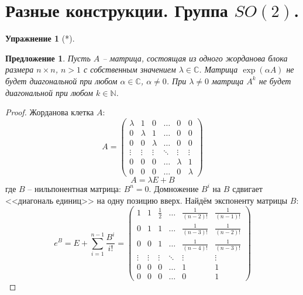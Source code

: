 \documentclass[12pt]{article}
\newtheorem{predl}[theorem]{Предложение}
\theoremstyle{definition}
\newtheorem{upr}[zad]{Упражнение}
\begin{document}
\section{Разные конструкции. Группа $SO(2)$.}
\begin{upr}[*]
\begin{predl}
    Пусть $A$ -- матрица, состоящая из одного жорданова блока размера $n\times n$, $n>1$ с собственным значением $\lambda\in\mathbb{C}$. Матрица $\exp(\alpha A)$ не будет диагональной при любом $\alpha\in\mathbb{C}$, $\alpha\neq 0$. При $\lambda\neq 0$ матрица $A^k$ не будет диагональной при любом $k\in\mathbb{N}$.
\end{predl}
\begin{proof}
    Жорданова клетка $A$:
    \begin{equation}
    A = \left(
    \begin{array}{cccccc}
    \lambda & 1 & 0 & \ldots & 0 & 0\\
    0 & \lambda & 1 & \ldots & 0 & 0\\
    0 & 0 & \lambda & \ldots & 0 & 0\\
    \vdots & \vdots & \vdots &\ddots & \vdots & \vdots\\
    0 & 0 & 0 & \ldots & \lambda & 1\\
    0 & 0 & 0 & \ldots & 0 & \lambda
    \end{array}
    \right)
    \end{equation}
    \begin{equation}
        A=\lambda E+B
    \end{equation}
    где $B$ -- нильпонентная матрица: $B^n=0$. Домножение $B^i$ на $B$ сдвигает <<диагональ единиц>> на одну позицию вверх. Найдём экспоненту матрицы $B$:
    \begin{equation}
        e^B=E+\sum\limits_{i=1}^{n-1}\frac{B^i}{i!}=\left(
    \begin{array}{cccccc}
    1 & 1 & \frac{1}{2} & \ldots & \frac{1}{(n-2)!} & \frac{1}{(n-1)!}\\
    0 & 1 & 1 & \ldots & \frac{1}{(n-3)!} & \frac{1}{(n-2)!}\\
    0 & 0 & 1 & \ldots & \frac{1}{(n-4)!} & \frac{1}{(n-3)!}\\
    \vdots & \vdots & \vdots &\ddots & \vdots & \vdots\\
    0 & 0 & 0 & \ldots & 1 & 1\\
    0 & 0 & 0 & \ldots & 0 & 1
    \end{array}
    \right)
    \end{equation}

\end{proof}
\end{upr}
\end{document}

